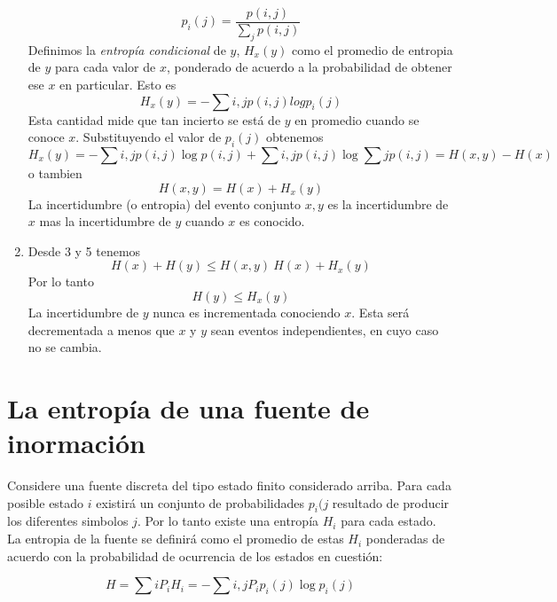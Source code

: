 \begin{enumerate}
\begin{equation}
p_{i}(j) = \frac{p(i,j)}{\sum_{j}p(i,j)}
\end{equation}
Definimos la \textit{entrop\'{i}a condicional} de $y$, $H_{x}(y)$ como el promedio de entropia de $y$ para cada valor de $x$, ponderado de acuerdo a la probabilidad de obtener ese $x$ en particular. Esto es
\begin{equation}
H_{x}(y) = -\sum{i,j}{}p(i,j)logp_{i}(j)
\end{equation}
Esta cantidad mide que tan incierto se est\'{a} de $y$ en promedio cuando se conoce $x$. Substituyendo el valor de $p_{i}(j)$ obtenemos
\begin{equation}
H_{x}(y) = -\sum{i,j}{}p(i,j) \log p(i,j) + \sum{i,j}{}p(i,j)\log\sum{j}{}p(i,j) = H(x,y) - H(x)
\end{equation}
o tambien
\begin{equation}
H(x,y) = H(x) + H_{x}(y)
\end{equation}
La incertidumbre (o entropia) del evento conjunto $x,y$ es la incertidumbre de $x$ mas la incertidumbre de $y$ cuando $x$ es conocido.
\item Desde 3 y 5 tenemos
\begin{equation}
H(x) + H(y) \leq H(x,y) \ H(x) + H_{x}(y)
\end{equation}
Por lo tanto
\begin{equation}
H(y) \leq H_{x}(y)
\end{equation}
La incertidumbre de $y$ nunca es incrementada conociendo $x$. Esta ser\'{a} decrementada a menos que $x$ y $y$ sean eventos independientes, en cuyo caso no se cambia.
\end{enumerate}

\section{La entrop\'{i}a de una fuente de inormaci\'{o}n}

Considere una fuente discreta del tipo estado finito
considerado arriba. Para cada posible estado $i$ existir\'{a} un
conjunto de probabilidades $p_{i}(j$ resultado de producir
los diferentes simbolos $j$. Por lo tanto existe una entrop\'{i}a $H_{i}$
para cada estado. La entropia de la fuente se definir\'{a} como
el promedio de estas $H_{i}$ ponderadas de acuerdo con la probabilidad
de ocurrencia de los estados en cuesti\'{o}n:

\begin{equation}
H = \sum{i}{} P_{i}H_{i}
  = - \sum{i,j}{} P_{i}p_{i}(j) \log p_{i}(j)
\end{equation}

